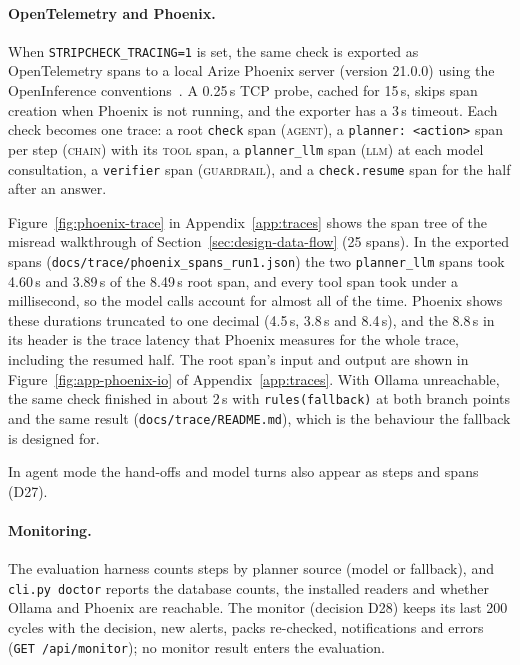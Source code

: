 \paragraph{OpenTelemetry and Phoenix.} When \texttt{STRIPCHECK\_TRACING=1} is set, the same check
is exported as OpenTelemetry spans to a local Arize Phoenix server (version 21.0.0) using the
OpenInference conventions~\cite{otel2026genai,arize2026openinference}. A 0.25\,s TCP probe, cached
for 15\,s, skips span creation when Phoenix is not running, and the exporter has a 3\,s timeout.
Each check becomes one trace: a root \texttt{check} span (\textsc{agent}), a
\texttt{planner:~<action>} span per step (\textsc{chain}) with its \textsc{tool} span, a
\texttt{planner\_llm} span (\textsc{llm}) at each model consultation, a \texttt{verifier} span
(\textsc{guardrail}), and a \texttt{check.resume} span for the half after an answer.

Figure~\ref{fig:phoenix-trace} in Appendix~\ref{app:traces} shows the span tree of the misread walkthrough of
Section~\ref{sec:design-data-flow} (25 spans). In the exported spans (\texttt{docs/trace/phoenix\_spans\_run1.json}) the two
\texttt{planner\_llm} spans took 4.60\,s and 3.89\,s of the 8.49\,s root span, and every tool span
took under a millisecond, so the model calls account for almost all of the time. Phoenix shows
these durations truncated to one decimal (4.5\,s, 3.8\,s and 8.4\,s), and the 8.8\,s in its header is
the trace latency that Phoenix measures for the whole trace, including the resumed half. The root
span's input and output are shown in Figure~\ref{fig:app-phoenix-io} of Appendix~\ref{app:traces}.
With Ollama unreachable, the same check finished in about 2\,s with \texttt{rules(fallback)} at both
branch points and the same \FLAGGED{} result (\texttt{docs/trace/README.md}), which is the behaviour
the fallback is designed for.

In agent mode the hand-offs and model turns also appear as steps and spans (D27).

\paragraph{Monitoring.} The evaluation harness counts steps by planner source (model or fallback),
and \texttt{cli.py doctor} reports the database counts, the installed readers and whether Ollama
and Phoenix are reachable. The monitor (decision D28) keeps its last 200 cycles with the decision, new alerts, packs re-checked, notifications and errors
(\texttt{GET /api/monitor}); no monitor result enters the evaluation.

